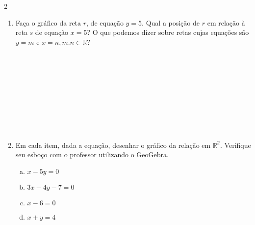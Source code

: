 \documentclass[a4paper,14pt]{article}
\begin{document}
\begin{multicols}{2}
\begin{enumerate}
\begin{enumerate}[a)]
        		\item $A = (0; \sqrt{3})$ e $B = (0; -7)$ \\\\\\\\\\\\\\\\\\\\\\\\\\\\
        		\item $A = (-5; 2)$ e $B = \bigg(-5; \frac{3}{2}\bigg)$.\\\\\\\\\\\\\\\\\\\\\\\\
        	\end{enumerate}
            \item Faça o gráfico da reta $r$, de equação $y = 5$. Qual a posição de $r$ em relação à reta $s$ de equação $x = 5$? O que podemos dizer sobre retas cujas equações são $y = m$ e $x = n, m. n \in \mathbb{R}$? \\\\\\\\\\\\\\\\\\\\
            \item Em cada item, dada a equação, desenhar o gráfico da relação em $\mathbb{R^2}$. Verifique seu esboço com o professor utilizando o GeoGebra.
            \begin{enumerate}[a)]
            	\item $x - 5y = 0$
            	\item $3x - 4y - 7 = 0$
            	\item $x - 6 = 0$
            	\item $x + y = 4$

\end{enumerate}
\end{enumerate}
\end{multicols}
\end{document}
